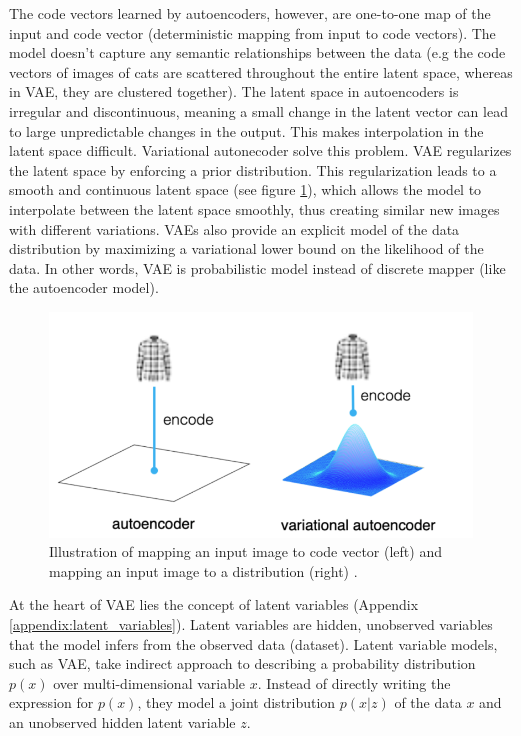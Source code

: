 The code vectors learned by autoencoders, however, are one-to-one map of the input and code vector (deterministic mapping from input to code vectors). The model doesn't capture any semantic relationships between the data (e.g the code vectors of images of cats are scattered throughout the entire latent space, whereas in VAE, they are clustered together). The latent space in autoencoders is irregular and discontinuous, meaning a small change in the latent vector can lead to large unpredictable changes in the output. This makes interpolation in the latent space difficult. Variational autonecoder solve this problem. VAE regularizes the latent space by enforcing a prior distribution. This regularization leads to a smooth and continuous latent space (see figure \ref{fig:ae_vs_vae}), which allows the model to interpolate between the latent space smoothly, thus creating similar new images with different variations. VAEs also provide an explicit model of the data distribution by maximizing a variational lower bound on the likelihood of the data. In other words, VAE is probabilistic model instead of discrete mapper (like the autoencoder model).

\begin{figure}[h]
    \centering
    \includegraphics[scale=0.5]{images/autoencoder-vs-variational-autoencoder-point-vs-distribution-768x409.png}
    \caption{Illustration of mapping an input image to code vector (left) and mapping an input image to a distribution (right) \cite{ae_vs_vae}.}
    \label{fig:ae_vs_vae}
\end{figure}

At the heart of VAE lies the concept of latent variables (Appendix \ref{appendix:latent_variables}). Latent variables are hidden, unobserved variables that the model infers from the observed data (dataset). Latent variable models, such as VAE, take indirect approach to describing a probability distribution $p(x)$ over multi-dimensional variable $x$. Instead of directly writing the expression for $p(x)$, they model a joint distribution $p(x|z)$ of the data $x$ and an unobserved hidden latent variable $z$.

